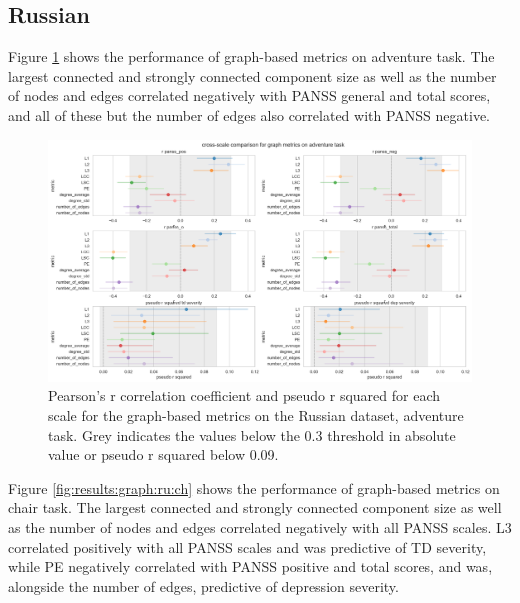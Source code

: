 \clearpage
\subsection{Russian}
Figure \ref{fig:results:graph:ru:ad} shows the performance of graph-based metrics on adventure task. The largest connected and strongly connected component size as well as the number of nodes and edges correlated negatively with PANSS general and total scores, and all of these but the number of edges also correlated with PANSS negative.

\begin{figure}[ht!]
    \includegraphics[width=1.1\textwidth, center]{Figures/chapter_4/graph/ru_adventure_scale_r.png} 
\captionsetup{width=\textwidth}
\caption[Graph Metrics: Russian, Adventure Task]{\label{fig:results:graph:ru:ad} Pearson's r correlation coefficient and pseudo r squared for each scale for the graph-based metrics on the Russian dataset, adventure task. Grey indicates the values below the 0.3 threshold in absolute value or pseudo r squared below 0.09.}
\end{figure}

\clearpage
Figure \ref{fig:results:graph:ru:ch} shows the performance of graph-based metrics on chair task. The largest connected and strongly connected component size as well as the number of nodes and edges correlated negatively with all PANSS scales. L3 correlated positively with all PANSS scales and was predictive of TD severity, while PE negatively correlated with PANSS positive and total scores, and was, alongside the number of edges, predictive of depression severity. 

